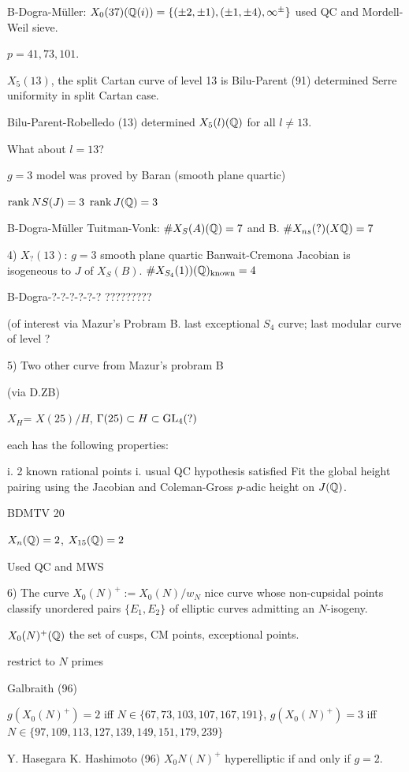 B-Dogra-M\"uller: $X_0(37)(\mathbb{Q}(i))= \{(\pm2,\pm1),(\pm1,\pm4),\infty^\pm\}$ used QC and Mordell-Weil sieve. 

$p=41,73,101$.

$X_5(13)$, the split Cartan curve of level 13 is Bilu-Parent (91) determined Serre uniformity in split Cartan case.

Bilu-Parent-Robelledo (13) determined $X_5(l)(\mathbb{Q})$ for all $l \neq 13$. 

What about $l=13$?

$g=3$ model was proved by Baran (smooth plane quartic) 

$\operatorname{rank} NS(J)=3$
$\operatorname{rank} J(\mathbb{Q})=3$

B-Dogra-M\"uller Tuitman-Vonk: $\#X_S(A)(\mathbb{Q})=7$ and B. $\#X_{ns}(?)(X\mathbb{Q})=7$


4) $X_?(13)$: $g=3$ smooth plane quartic Banwait-Cremona Jacobian is isogeneous to $J$ of $X_S(B)$.
$\#X_{S_4}(1))(\mathbb{Q})_{\text{known}}= 4$

B-Dogra-?-?-?-?-?-? ?????????

(of interest via Mazur's Probram B. last exceptional $S_4$ curve; last modular curve of level ?


5) Two other curve from Mazur's probram B

(via D.ZB)

$X_H$= $X(25)/H$, $\Gamma(25) \subset H \subset \operatorname{GL}_4(?)$

each has the following properties:

i. 2 known rational points
i. usual QC hypothesis satisfied 
Fit the global height pairing using the Jacobian and Coleman-Gross $p$-adic height on $J(\mathbb{Q})$.

BDMTV 20 

$X_n(\mathbb{Q})=2$, $X_{15}(\mathbb{Q})=2$

Used QC and MWS

6) The curve $X_0(N)^+:= X_0(N)/w_N$ nice curve whose non-cupsidal points classify unordered pairs $\{E_1,E_2\}$ of elliptic curves admitting an $N$-isogeny. 

$X_0(N)^+(\mathbb{Q})$ the set of cusps, CM points, exceptional points.

restrict to $N$ primes

Galbraith (96)

$g(X_0(N)^+)= 2$ iff $N \in \{67,73,103,107,167,191\}$, $g(X_0(N)^+)= 3$ iff $N \in \{97,109,113,127,139,149,151,179,239\}$ 

Y. Hasegara K. Hashimoto (96) $X_0N(N)^+$ hyperelliptic if and only if $g=2$.


